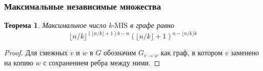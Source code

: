 \documentclass[12pt]{article}
\newtheorem{theorem}{Теорема}
\begin{document}
\subsubsection{Максимальные независимые множества}
\begin{theorem}
Максимальное число k-$\text{MIS}$ в графе равно
\begin{equation}\label{eq:1}
    {\lfloor n/k \rfloor}^{\left( \lfloor n/k \rfloor + 1\right)k - n}\left(\lfloor n/k \rfloor + 1\right)^{n - \lfloor n/k \rfloor k}
\end{equation}
\end{theorem}
\begin{proof}
	Для смежных $v$ и $w$ в $G$ обозначим $G_{v\to w}$ как граф, в котором $v$ заменено на копию $w$ с сохранением ребра между ними.
	

\end{proof}
\end{document}
